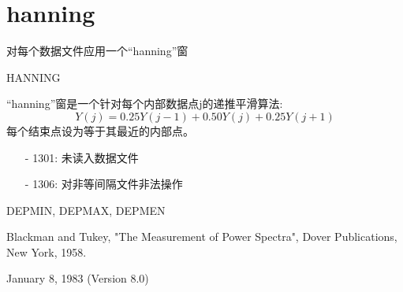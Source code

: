 \section{hanning}
\label{cmd:hanning}

对每个数据文件应用一个``hanning''窗

HANNING

``hanning''窗是一个针对每个内部数据点j的递推平滑算法:
	\[ Y(j)=0.25Y(j-1)+0.50Y(j)+0.25Y(j+1)\]
每个结束点设为等于其最近的内部点。

\begin{itemize}
\item[-]1301: 未读入数据文件
\item[-]1306: 对非等间隔文件非法操作
\end{itemize}

DEPMIN, DEPMAX, DEPMEN

Blackman and Tukey, "The Measurement of Power Spectra", Dover Publications, New York, 1958.

January 8, 1983 (Version 8.0)
